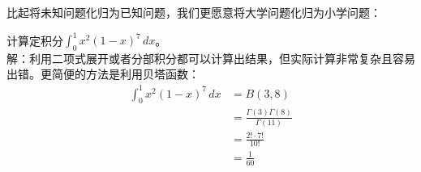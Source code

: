 \documentclass{ctexbook}
\begin{document}
比起将未知问题化归为已知问题，我们更愿意将大学问题化归为小学问题：
\begin{example}[贝塔函数的使用]
    计算定积分$\int_{0}^{1}x^2(1-x)^7\,dx$。\\
    解：利用二项式展开或者分部积分都可以计算出结果，但实际计算非常复杂且容易出错。更简便的方法是利用贝塔函数：\begin{align*}
        \int_{0}^{1}x^2(1-x)^7\,dx&=B(3,8)\\
                                 &=\frac{\Gamma (3)\Gamma (8)}{\Gamma (11)}\\
                                 &=\frac{2! \cdot 7!}{10!}\\
                                 &=\frac{1}{60}
    \end{align*}
\end{example}
\end{document}
